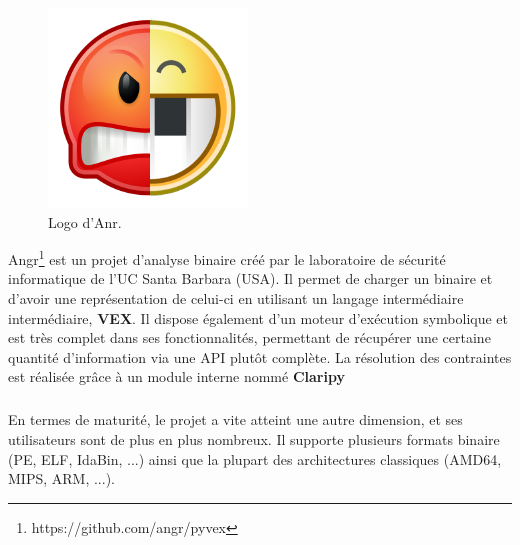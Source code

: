 \begin{figure}[h]
    \centering
    \includegraphics[scale=0.3]{images/angr.png}
    \caption{Logo d'Anr.}
\end{figure}
Angr\footnote{https://github.com/angr/pyvex} est un projet d'analyse binaire créé par le laboratoire de sécurité informatique de l'UC Santa Barbara (USA).
Il permet de charger un binaire et d'avoir une représentation de celui-ci en utilisant un langage intermédiaire intermédiaire, \textbf{VEX}.
Il dispose également d'un moteur d'exécution symbolique et est très complet dans ses fonctionnalités, permettant de récupérer une certaine quantité d'information via
une API plutôt complète. La résolution des contraintes est réalisée grâce à un module interne nommé \textbf{Claripy}
\subparagraph{}
En termes de maturité, le projet a vite atteint une autre dimension, et ses utilisateurs sont de plus en plus nombreux. Il supporte plusieurs formats
binaire (PE, ELF, IdaBin, ...) ainsi que la plupart des architectures classiques (AMD64, MIPS, ARM, ...).

